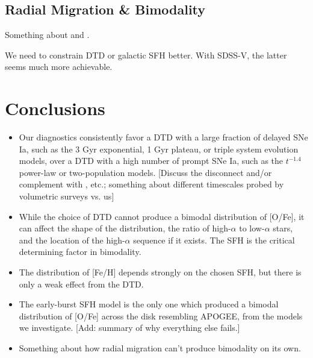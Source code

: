 \documentclass[modern,linenumbers]{aastex631}
\begin{document}
\subsection{Radial Migration \& Bimodality}

Something about \citet{Johnson2021-Migration} and \citet{Schonrich2009-RadialMixing}.

We need to constrain DTD or galactic SFH better. With SDSS-V, the latter seems much more achievable.

\section{Conclusions}
\label{sec:conclusions}

\begin{itemize}

    \item Our diagnostics consistently favor a DTD with a large fraction of delayed SNe Ia, such as the 3 Gyr exponential, 1 Gyr plateau, or triple system evolution models, over a DTD with a high number of prompt SNe Ia, such as the $t^{-1.4}$ power-law or two-population models. [Discuss the disconnect and/or complement with \citet{Maoz2017-CosmicDTD}, etc.; something about different timescales probed by volumetric surveys vs. us]
    
    \item While the choice of DTD cannot produce a bimodal distribution of [O/Fe], it can affect the shape of the distribution, the ratio of high-$\alpha$ to low-$\alpha$ stars, and the location of the high-$\alpha$ sequence if it exists. The SFH is the critical determining factor in bimodality.

    \item The distribution of [Fe/H] depends strongly on the chosen SFH, but there is only a weak effect from the DTD.

    \item The early-burst SFH model is the only one which produced a bimodal distribution of [O/Fe] across the disk resembling APOGEE, from the models we investigate. [Add: summary of why everything else fails.]

    \item Something about how radial migration can't produce bimodality on its own.
    
\end{itemize}
\end{document}
